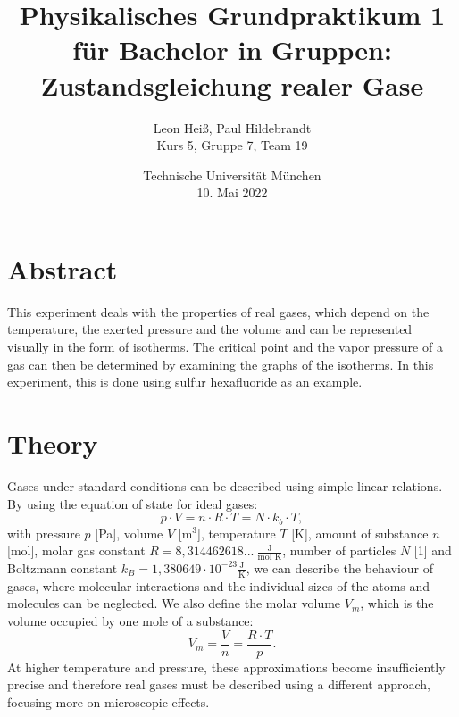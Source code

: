 \documentclass[10pt,a4paper]{article}
\title{Physikalisches Grundpraktikum 1 für Bachelor in Gruppen:\\Zustandsgleichung realer Gase}
\author{Leon Heiß, Paul Hildebrandt\\Kurs 5, Gruppe 7, Team 19}
\begin{document}
\date{Technische Universität München\\10. Mai 2022}
\maketitle

\section*{Abstract}
This experiment deals with the properties of real gases, which depend on the temperature, the exerted pressure and the volume and can be represented visually in the form of isotherms. The critical point and the vapor pressure of a gas can then be determined by examining the graphs of the isotherms. In this experiment, this is done using sulfur hexafluoride as an example.

\tableofcontents

\newpage

\section{Theory}

Gases under standard conditions can be described using simple linear relations. By using the equation of state for ideal gases:
\begin{equation}
  p \cdot V = n \cdot R \cdot T = N \cdot k_{b} \cdot T,
\end{equation}
with pressure $p$ [Pa], volume $V$ [m$^3$], temperature $T$ [K], amount of substance $n$ [mol], molar gas constant $R=8,314462618... \ \frac{\textrm{J}}{\textrm{mol K}}$, number of particles $N$ [1] and Boltzmann constant $k_B = 1,380649 \cdot 10^{-23} \frac{\textrm{J}}{\textrm{K}}$, we can describe the behaviour of gases, where molecular interactions and the individual sizes of the atoms and molecules can be neglected. We also define the molar volume $V_m$, which is the volume occupied by one mole of a substance:
\begin{equation}
    V_m = \frac{V}{n} = \frac{R \cdot T}{p}.
\end{equation}
At higher temperature and pressure, these approximations become insufficiently precise and therefore real gases must be described using a different approach, focusing more on microscopic effects.
\end{document}

